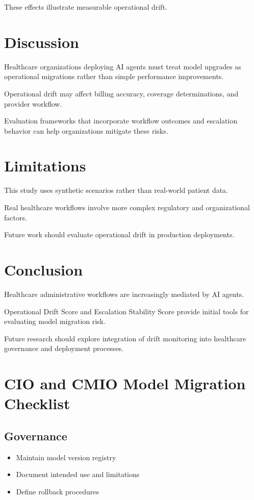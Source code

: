 \documentclass[11pt]{article}
\begin{document}
These effects illustrate measurable operational drift.

\section{Discussion}

Healthcare organizations deploying AI agents must treat model upgrades as operational migrations rather than simple performance improvements.

Operational drift may affect billing accuracy, coverage determinations, and provider workflow.

Evaluation frameworks that incorporate workflow outcomes and escalation behavior can help organizations mitigate these risks.

\section{Limitations}

This study uses synthetic scenarios rather than real-world patient data.

Real healthcare workflows involve more complex regulatory and organizational factors.

Future work should evaluate operational drift in production deployments.

\section{Conclusion}

Healthcare administrative workflows are increasingly mediated by AI agents.

Operational Drift Score and Escalation Stability Score provide initial tools for evaluating model migration risk.

Future research should explore integration of drift monitoring into healthcare governance and deployment processes.

\appendix

\section{CIO and CMIO Model Migration Checklist}

\subsection{Governance}

\begin{itemize}
\item Maintain model version registry
\item Document intended use and limitations
\item Define rollback procedures
\end{itemize}
\end{document}
